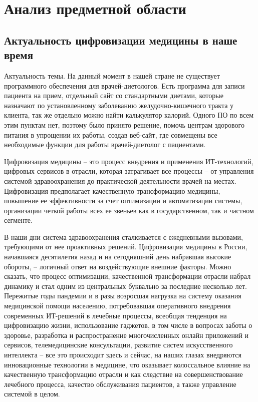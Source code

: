 \section{Анализ предметной области}
\subsection{Актуальность цифровизации медицины в наше время}

Актуальность темы. На данный момент в нашей стране не существует программного обеспечения для врачей-диетологов. Есть программа для записи пациента на прием, отдельный сайт со стандартными диетами, которые назначают по установленному заболеванию желудочно-кишечного тракта у клиента, так же отдельно можно найти калькулятор калорий. Одного ПО по всем этим пунктам нет, поэтому было принято решение, помочь центрам здорового питания в упрощении их работы, создав веб-сайт, где совмещены все необходимые функции для работы врачей-диетолог с пациентами.

Цифровизация медицины – это процесс внедрения и применения ИТ-технологий, цифровых сервисов в отрасли, которая затрагивает все процессы – от управления системой здравоохранения до практической деятельности врачей на местах. Цифровизация предполагает качественную трансформацию медицины, повышение ее эффективности за счет оптимизации и автоматизации системы, организации четкой работы всех ее звеньев как в государственном, так и частном сегменте.

В наши дни система здравоохранения сталкивается с ежедневными вызовами, требующими от нее проактивных решений. Цифровизация медицины в России, начавшаяся десятилетия назад и на сегодняшний день набравшая высокие обороты, – логичный ответ на воздействующие внешние факторы. Можно сказать, что процесс оптимизации, качественной трансформации отрасли набрал динамику и стал одним из центральных буквально за последние несколько лет. Пережитые годы пандемии и в разы возросшая нагрузка на систему оказания медицинской помощи населению, потребовавшая оперативного внедрения современных ИТ-решений в лечебные процессы, всеобщая тенденция на цифровизацию жизни, использование гаджетов, в том числе в вопросах заботы о здоровье, разработка и распространение многочисленных онлайн приложений и сервисов, телемедицинские консультации, развитие систем искусственного интеллекта – все это происходит здесь и сейчас, на наших глазах внедряются инновационные технологии в медицине, что оказывает колоссальное влияние на качественную трансформацию отрасли и как следствие на совершенствование лечебного процесса, качество обслуживания пациентов, а также управление системой в целом.


